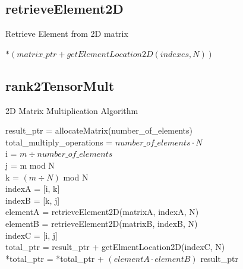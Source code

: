 \documentclass[10pt,onecolumn]{article}
\begin{document}
\subsection{retrieveElement2D}
    \begin{algorithm}[H]
        \caption{Retrieve Element from 2D matrix}
        \Return $*(matrix\_ptr + getElementLocation2D(indexes, N))$
    \end{algorithm}
    
\subsection{rank2TensorMult}
    \begin{algorithm}[H]
        \caption{2D Matrix Multiplication Algorithm}
        
        result\_ptr = allocateMatrix(number\_of\_elements) \\
        total\_multiply\_operations = $number\_of\_elements \cdot N$ \\
        { i = $ m \div number\_of\_elements $ \\
          j = m mod N \\
          k = $ (m \div N)$ mod N \\
          
          indexA = [i, k] \\
          indexB = [k, j] \\
          
          elementA = retrieveElement2D(matrixA, indexA, N)\\
          elementB = retrieveElement2D(matrixB, indexB, N)\\
          
          indexC = [i, j]\\
          total\_ptr = result\_ptr + getElmentLocation2D(indexC, N) \\
          *total\_ptr = *total\_ptr + $(elementA \cdot elementB)$
        }%
        \Return result\_ptr
    \end{algorithm}
    
\end{document}
